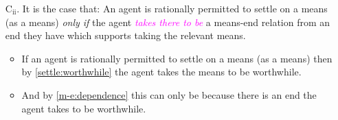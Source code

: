 \documentclass[10pt]{article}
\newcommand{\hozlinedash}[0]{%
  \noindent\hdashrule[0.5ex][c]{\textwidth}{.1pt}{2.5pt}
}
\begin{document}
\begin{enumerate}[label=\arabic*., ref=(\arabic*)]
\item[C\(_{\text{ii}}\).]\label{together} It is the case that:
  An agent is rationally permitted to settle on a means (as a means) \emph{only if} the agent \textcolor{fuchsia}{\emph{takes there to be}} a means-end relation from an end they have which supports taking the relevant means.
  \begin{itemize}
  \item If an agent is rationally permitted to settle on a means (as a means) then by \ref{settle:worthwhile} the agent takes the means to be worthwhile.
  \item And by \ref{m-e:dependence} this can only be because there is an end the agent takes to be worthwhile.
  \end{itemize}
\end{enumerate}

\hozlinedash
\end{document}
